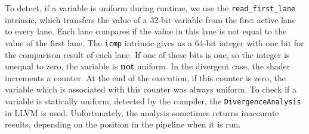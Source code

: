To detect, if a variable is uniform during runtime, we use the \texttt{read\_first\_lane} intrinsic, which transfers the value of a 32-bit variable from the first active lane to every lane.
Each lane compares if the value in this lane is not equal to the value of the first lane.
The \texttt{icmp} intrinsic gives us a 64-bit integer with one bit for the comparison result of each lane.
If one of these bits is one, so the integer is unequal to zero, the variable is \textbf{not} uniform.
In the divergent case, the shader increments a counter.
At the end of the execution, if this counter is zero, the variable which is associated with this counter was always uniform.
To check if a variable is statically uniform, detected by the compiler, the \texttt{DivergenceAnalysis} in LLVM is used.
Unfortunately, the analysis sometimes returns inaccurate results, depending on the position in the pipeline when it is run.
